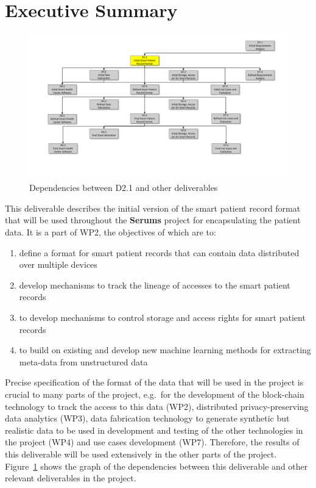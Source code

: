 
\section*{Executive Summary}
\label{sec:execsum}

\begin{figure}
    \includegraphics[scale=0.42]{figures/Serums-D21-Dependencies.pdf}
    \caption{Dependencies between D2.1 and other deliverables}
    \label{fig:WP2dependencies}
\end{figure}

This deliverable describes the initial version of the smart patient record format that will be used throughout the \textbf{Serums} project for encapsulating the patient data. It is a part of WP2, the objectives of which are to:
\begin{enumerate}
    \item define a format for smart patient records that can contain data distributed over multiple devices 
    \item develop mechanisms to track the lineage of accesses to the smart patient records
    \item to develop mechanisms to control storage and access rights for smart patient records
    \item to build on existing and develop new machine learning methods for extracting meta-data from unstructured data
\end{enumerate}

Precise specification of the format of the data that will be used in the project is crucial to many parts of the project, e.g.~for the development of the block-chain technology to track the access to this data (WP2), distributed privacy-preserving data analytics (WP3), data fabrication technology to generate synthetic but realistic data to be used in development and testing of the other technologies in the project (WP4) and use cases development (WP7). Therefore, the results of this deliverable will be used extensively in the other parts of the project. Figure~\ref{fig:WP2dependencies} shows the graph of the dependencies between this deliverable and other relevant deliverables in the project. 


